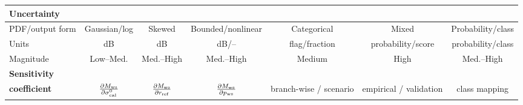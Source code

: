 \begin{table}[H]
{\begin{tabular}{|l|c|c|c|c|c|c|}
    \textbf{Uncertainty} &  & &  &  &&  \\ \hline
    PDF/output form & Gaussian/log & Skewed & Bounded/nonlinear & Categorical & Mixed & Probability/class \\ \hline
    Units & dB & dB & dB/-- & flag/fraction & probability/score & probability/class \\ \hline
    Magnitude & Low--Med. & Med.--High & Med.--High & Medium & High & Med.--High \\ \hline
    \textbf{Sensitivity} & & & &  &  &  \\
    \textbf{coefficient} & $\frac{\partial M_{\rm ws}}{\partial \sigma^0_{\rm cal}}$ & $\frac{\partial M_{\rm ws}}{\partial r_{\rm ref}}$ & $\frac{\partial M_{\rm ws}}{\partial p_{\rm ws}}$ & branch-wise / scenario & empirical / validation & class mapping \\ \hline
  \end{tabular}%
  }
  \label{tab:wetsnow_effects_table}
\end{table}

